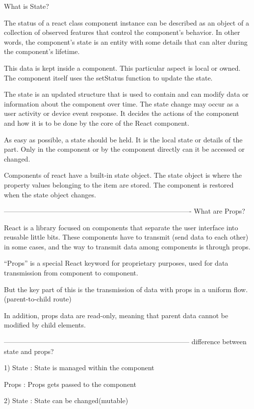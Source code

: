What is State?

The status of a react class component instance can be described as an 
object of a collection of observed features that control the component’s 
behavior. In other words, the component’s state is an entity with some 
details that can alter during the component’s lifetime.

This data is kept inside a component. This particular aspect is local or owned. 
The component itself uses the setStatus function to update the state. 

The state is an updated structure that is used to contain and can 
modify data or information about the component over time. 
The state change may occur as a user activity or device event response. 
It decides the actions of the component and how it is to be done by the core 
of the React component. 

As easy as possible, a state should be held. It is the local state or 
details of the part. Only in the component or by the component directly 
can it be accessed or changed. 

Components of react have a built-in state object. 
The state object is where the property values belonging to the item are stored. 
The component is restored when the state object changes.

----------------------------------------------------------------------------------
What are Props?

React is a library focused on components that separate the user interface 
into reusable little bits. These components have to transmit 
(send data to each other) in some cases, and the way to transmit data among 
components is through props. 

“Props” is a special React keyword for proprietary purposes, 
used for data transmission from component to component. 

But the key part of this is the transmission of data with props in a 
uniform flow. (parent-to-child route)

In addition, props data are read-only, meaning that parent data 
cannot be modified by child elements.

---------------------------------------------------------------------------------
difference between state and props?

1)
State : State is managed within the component

Props : Props gets passed to the component

2)
State : State can be changed(mutable)

